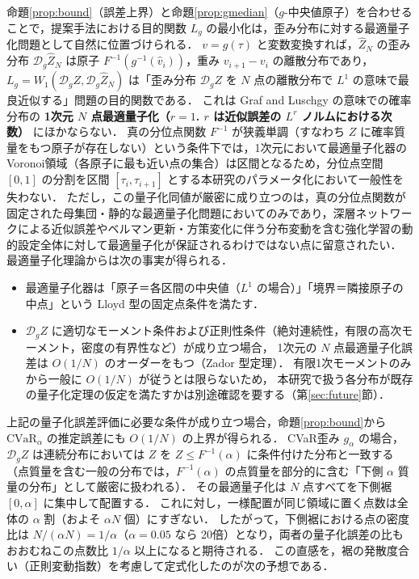 \documentclass[a4paper,10pt]{jsarticle}
\theoremstyle{definition}
\newcommand{\CVaR}{\mathrm{CVaR}}
\newcommand{\Wone}{W_1}
\newcommand{\Finv}{F^{-1}}
\newcommand{\dist}{\mathcal{D}_g}
\begin{document}
命題\ref{prop:bound}（誤差上界）と命題\ref{prop:gmedian}（$g$-中央値原子）を合わせることで，提案手法における目的関数 $L_g$ の最小化は，歪み分布に対する最適量子化問題として自然に位置づけられる．
$v=g(\tau)$ と変数変換すれば，$\hat Z_N$ の歪み分布 $\dist\hat Z_N$ は原子 $\Finv(g^{-1}(\hat v_i))$，重み $v_{i+1}-v_i$ の離散分布であり，
$L_g=\Wone(\dist Z,\dist\hat Z_N)$ は「歪み分布 $\dist Z$ を $N$ 点の離散分布で $L^1$ の意味で最良近似する」問題の目的関数である．
これは Graf and Luschgy \cite{graf2000quantization} の意味での確率分布の \textbf{1次元 $N$ 点最適量子化（$r=1$. $r$ は近似誤差の $L^r$ ノルムにおける次数）} にほかならない．
真の分位点関数 $\Finv$ が狭義単調（すなわち $Z$ に確率質量をもつ原子が存在しない）という条件下では，1次元において最適量子化器のVoronoi領域（各原子に最も近い点の集合）は区間となるため，分位点空間 $[0,1]$ の分割を区間 $[\tau_i,\tau_{i+1}]$ とする本研究のパラメータ化において一般性を失わない．
ただし，この量子化同値が厳密に成り立つのは，真の分位点関数が固定された母集団・静的な最適量子化問題においてのみであり，深層ネットワークによる近似誤差やベルマン更新・方策変化に伴う分布変動を含む強化学習の動的設定全体に対して最適量子化が保証されるわけではない点に留意されたい．
最適量子化理論からは次の事実が得られる．
\begin{itemize}
  \item 最適量子化器は「原子＝各区間の中央値（$L^1$ の場合）」「境界＝隣接原子の中点」という Lloyd 型の固定点条件を満たす．
  \item $\dist Z$ に適切なモーメント条件および正則性条件（絶対連続性，有限の高次モーメント，密度の有界性など）が成り立つ場合，
  1次元の $N$ 点最適量子化誤差は $O(1/N)$ のオーダーをもつ（Zador 型定理）．
  有限1次モーメントのみから一般に $O(1/N)$ が従うとは限らないため，
  本研究で扱う各分布が既存の量子化定理の仮定を満たすかは別途確認を要する（第\ref{sec:future}節）．
\end{itemize}
上記の量子化誤差評価に必要な条件が成り立つ場合，命題\ref{prop:bound}から $\CVaR_\alpha$ の推定誤差にも $O(1/N)$ の上界が得られる．
CVaR歪み $g_\alpha$ の場合，$\dist Z$ は連続分布においては $Z$ を $Z\le\Finv(\alpha)$ に条件付けた分布と一致する（点質量を含む一般の分布では，$\Finv(\alpha)$ の点質量を部分的に含む「下側 $\alpha$ 質量の分布」として厳密に扱われる）．
その最適量子化は $N$ 点すべてを下側裾 $[0,\alpha]$ に集中して配置する．
これに対し，一様配置が同じ領域に置く点数は全体の $\alpha$ 割（およそ $\alpha N$ 個）にすぎない．
したがって，下側裾における点の密度比は $N/(\alpha N)=1/\alpha$（$\alpha=0.05$ なら 20倍）となり，両者の量子化誤差の比もおおむねこの点数比 $1/\alpha$ 以上になると期待される．
この直感を，裾の発散度合い（正則変動指数）を考慮して定式化したのが次の予想である．
\end{document}
